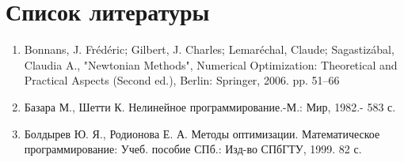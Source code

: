 \section{Список литературы}
\label{sec:literature}
\begin{enumerate}
    \item Bonnans, J. Frédéric; Gilbert, J. Charles; Lemaréchal, Claude; Sagastizábal, Claudia A., "Newtonian Methods", Numerical Optimization: Theoretical and Practical Aspects (Second ed.), Berlin: Springer, 2006. pp. 51–66
    \item Базара М., Шетти К. Нелинейное программирование.-М.: Мир, 1982.- 583 с.
    \item Болдырев Ю. Я., Родионова Е. А. Методы оптимизации. Математическое программирование: Учеб. пособие СПб.: Изд-во СПбГТУ, 1999. 82 с.
\end{enumerate}